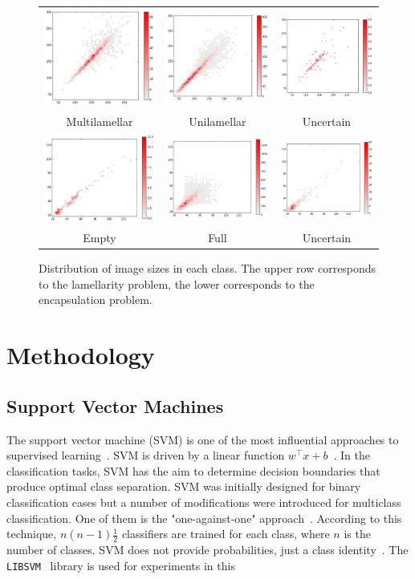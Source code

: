 \documentclass[a4paper, 11pt, table]{article}
\begin{document}
\begin{landscape}
\begin{figure}
\centering
\begin{tabular}{ccc}
 \includegraphics[scale=0.4]{img_size/lamellarity/heatmap_multilamellar.png} & \includegraphics[scale=0.4]{img_size/lamellarity/heatmap_unilamellar.png} & \includegraphics[scale=0.4]{img_size/lamellarity/heatmap_uncertain.png} \\
	Multilamellar & Unilamellar & Uncertain \\[6pt]
	\includegraphics[scale=0.4]{img_size/encapsulation/heatmap_empty.png} & \includegraphics[scale=0.4]{img_size/encapsulation/heatmap_full.png} & \includegraphics[scale=0.4]{img_size/encapsulation/heatmap_uncertain.png} \\
	Empty & Full & Uncertain \\[6pt]
\end{tabular}
\caption{Distribution of image sizes in each class. The upper row corresponds to the lamellarity problem, the lower corresponds to the encapsulation problem.}
\label{fig:img_size_per_class}
\end{figure}
\end{landscape}


\section{Methodology}

\subsection{Support Vector Machines}
\label{sec:svm}
The support vector machine (SVM) is one of the most influential approaches to supervised learning~\cite{Boser:1992:TAO:130385.130401}. SVM is driven by a linear function $w^\top x + b$~\cite{dl_book}. In the classification tasks, SVM has the aim to determine decision boundaries that produce optimal class separation. SVM was initially designed for binary classification cases but a number of modifications were introduced for multiclass classification. One of them is the "one-against-one" approach~\cite{Knerr1990}. According to this technique, $n (n-1)\frac{1}{2}$ classifiers are trained for each class, where $n$ is the number of classes. SVM does not provide probabilities, just a class identity~\cite{dl_book}. The \texttt{LIBSVM}~\cite{CC01a} library is used for experiments in this
\end{document}
